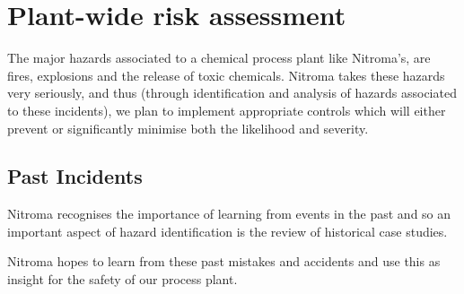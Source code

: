 \section{Plant-wide risk assessment}

The major hazards associated to a chemical process plant like Nitroma’s, are fires, explosions and the release of toxic chemicals. Nitroma takes these hazards very seriously, and thus (through identification and analysis of hazards associated to these incidents), we plan to implement appropriate controls which will either prevent or significantly minimise both the likelihood and severity. 

\subsection{Past Incidents}

Nitroma recognises the importance of learning from events in the past and so an important aspect of hazard identification is the review of historical case studies. 


Nitroma hopes to learn from these past mistakes and accidents and use this as insight for the safety of our process plant. 

